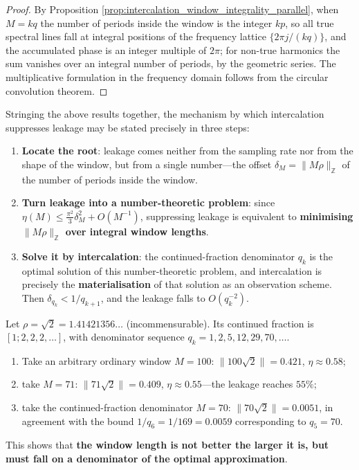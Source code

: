 \begin{proof}
By Proposition \ref{prop:intercalation_window_integrality_parallel}, when $M=kq$ the number of periods inside the window is the integer $kp$, so all true spectral lines fall at integral positions of the frequency lattice $\{2\pi j/(kq)\}$, and the accumulated phase is an integer multiple of $2\pi$; for non-true harmonics the sum vanishes over an integral number of periods, by the geometric series. The multiplicative formulation in the frequency domain follows from the circular convolution theorem.
\end{proof}

\begin{remark}\label{rem:leakage_intercalation_mechanism}
Stringing the above results together, the mechanism by which intercalation suppresses leakage may be stated precisely in three steps:
\begin{enumerate}[label=(\roman*)]
    \item \textbf{Locate the root}: leakage comes neither from the sampling rate nor from the shape of the window, but from a single number---the offset $\delta_M=\|M\rho\|_{\mathbb{Z}}$ of the number of periods inside the window.
    \item \textbf{Turn leakage into a number-theoretic problem}: since $\eta(M)\le\frac{\pi^2}{3}\delta_M^2+O(M^{-1})$, suppressing leakage is equivalent to \textbf{minimising $\|M\rho\|_{\mathbb{Z}}$ over integral window lengths}.
    \item \textbf{Solve it by intercalation}: the continued-fraction denominator $q_k$ is the optimal solution of this number-theoretic problem, and intercalation is precisely the \textbf{materialisation} of that solution as an observation scheme. Then $\delta_{q_k}<1/q_{k+1}$, and the leakage falls to $O(q_k^{-2})$.
\end{enumerate}
\end{remark}

\begin{example}\label{ex:intercalation_vs_normal_window}
Let $\rho=\sqrt2=1.41421356\ldots$ (incommensurable). Its continued fraction is $[1;2,2,2,\dots]$, with denominator sequence $q_k=1,2,5,12,29,70,\dots$.
\begin{enumerate}[label=(\roman*)]
    \item Take an arbitrary ordinary window $M=100$: $\|100\sqrt2\|=0.421$, $\eta\approx0.58$;
    \item take $M=71$: $\|71\sqrt2\|=0.409$, $\eta\approx0.55$---the leakage reaches $55\%$;
    \item take the continued-fraction denominator $M=70$: $\|70\sqrt2\|=0.0051$, in agreement with the bound $1/q_6=1/169=0.0059$ corresponding to $q_5=70$.
\end{enumerate}
This shows that \textbf{the window length is not better the larger it is, but must fall on a denominator of the optimal approximation}.
\end{example}

